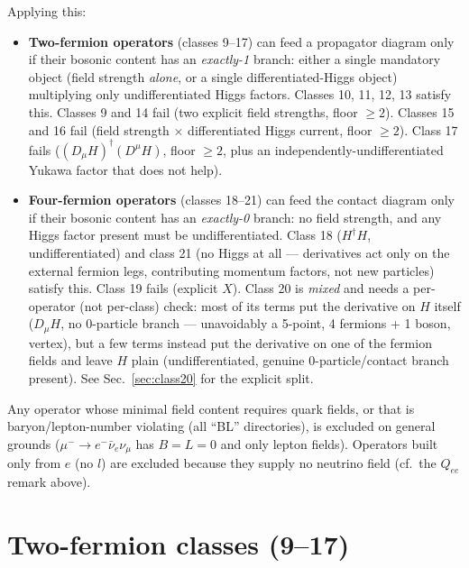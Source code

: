 \documentclass[11pt,a4paper]{article}
\newcommand{\Q}[1]{Q_{#1}}
\begin{document}
Applying this:
\begin{itemize}
\item \textbf{Two-fermion operators} (classes 9--17) can feed a
  propagator diagram only if their bosonic content has an
  \emph{exactly-1} branch: either a single mandatory object (field
  strength \emph{alone}, or a single differentiated-Higgs object)
  multiplying only undifferentiated Higgs factors. Classes 10, 11, 12, 13
  satisfy this. Classes 9 and 14 fail (two explicit field strengths, floor
  $\geq 2$). Classes 15 and 16 fail (field strength $\times$ differentiated
  Higgs current, floor $\geq 2$). Class 17 fails ($(D_\mu H)^\dagger
  (D^\mu H)$, floor $\geq 2$, plus an independently-undifferentiated Yukawa
  factor that does not help).
\item \textbf{Four-fermion operators} (classes 18--21) can feed the
  contact diagram only if their bosonic content has an \emph{exactly-0}
  branch: no field strength, and any Higgs factor present must be
  undifferentiated. Class 18 ($H^\dagger H$, undifferentiated) and class 21
  (no Higgs at all --- derivatives act only on the external fermion legs,
  contributing momentum factors, not new particles) satisfy this. Class 19
  fails (explicit $X$). Class 20 is \emph{mixed} and needs a per-operator
  (not per-class) check: most of its terms put the derivative on $H$
  itself ($D_\mu H$, no 0-particle branch --- unavoidably a 5-point,
  4 fermions + 1 boson, vertex), but a few terms instead put the
  derivative on one of the fermion fields and leave $H$ plain
  (undifferentiated, genuine 0-particle/contact branch present). See
  Sec.~\ref{sec:class20} for the explicit split.
\end{itemize}
Any operator whose minimal field content requires quark fields, or that is
baryon/lepton-number violating (all ``BL'' directories), is excluded on
general grounds ($\mu^-\to e^-\bar\nu_e\nu_\mu$ has $B=L=0$ and only
lepton fields). Operators built only from $e$ (no $l$) are excluded because
they supply no neutrino field (cf.\ the $\Q{ee}$ remark above).

\section{Two-fermion classes (9--17)}
\end{document}
